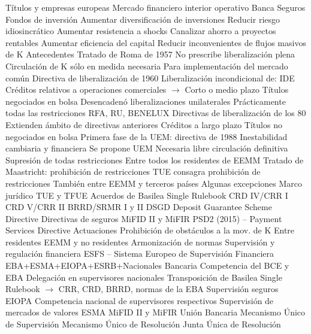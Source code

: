 \documentclass{nuevotema}
\begin{document}
\begin{esquemal}
				\4 Títulos y empresas europeas
				\4 Mercado financiero interior operativo
				\4[] Banca
				\4[] Seguros
				\4[] Fondos de inversión
			\3 Aumentar diversificación de inversiones
				\4 Reducir riesgo idiosincrático
				\4 Aumentar resistencia a shocks
			\3 Canalizar ahorro a proyectos rentables
				\4 Aumentar eficiencia del capital
				\4 Reducir inconvenientes de flujos masivos de K
		\2 Antecedentes
			\3 Tratado de Roma de 1957
				\4 No prescribe liberalización plena
				\4 Circulación de K sólo en medida necesaria
				\4[] Para implementación del mercado común
			\3 Directiva de liberalización de 1960
				\4 Liberalización incondicional de:
				\4[] IDE
				\4[] Créditos relativos a operaciones comerciales
				\4[] $\to$ Corto o medio plazo
				\4[] Títulos negociados en bolsa
				\4 Desencadenó liberalizaciones unilaterales
				\4[] Prácticamente todas las restricciones
				\4[] RFA, RU, BENELUX
			\3 Directivas de liberalización de los 80
				\4 Extienden ámbito de directivas anteriores
				\4[] Créditos a largo plazo
				\4[] Títulos no negociados en bolsa
			\3 Primera fase de la UEM: directiva de 1988
				\4 Inestabilidad cambiaria y financiera
				\4 Se propone UEM
				\4 Necesaria libre circulación definitiva
				\4 Supresión de todas restricciones
				\4[] Entre todos los residentes de EEMM
			\3 Tratado de Maastricht: prohibición de restricciones
				\4 TUE consagra prohibición de restricciones
				\4 También entre EEMM y terceros países
				\4 Algunas excepciones
		\2 Marco jurídico
			\3 TUE y TFUE
			\3 Acuerdos de Basilea
			\3 Single Rulebook
				\4 CRD IV/CRR I
				\4 CRD V/CRR II
				\4 BRRD/SRMR I y II
				\4 DSGD
				\4[] Deposit Guarantee Scheme Directive
			\3 Directivas de seguros
			\3 MiFID II y MiFIR
			\3 PSD2 (2015) -- Payment Services Directive
		\2 Actuaciones
			\3 Prohibición de obstáculos a la mov. de K
				\4 Entre residentes EEMM y no residentes
				\4 Armonización de normas
			\3 Supervisión y regulación financiera
				\4 ESFS -- Sistema Europeo de Supervisión Financiera
				\4[] EBA+ESMA+EIOPA+ESRB+Nacionales
				\4 Bancaria
				\4[] Competencia del BCE y EBA
				\4[] Delegación en supervisores nacionales
				\4[] Transposición de Basilea
				\4[] Single Rulebook
				\4[] $\to$ CRR, CRD, BRRD, normas de la EBA
				\4 Supervisión seguros
				\4[] EIOPA
				\4[] Competencia nacional de supervisores respectivos
				\4 Supervisión de mercados de valores
				\4[] ESMA
				\4[] MiFID II y MiFIR
			\3 Unión Bancaria
				\4 Mecanismo Único de Supervisión
				\4 Mecanismo Único de Resolución
				\4[] Junta Única de Resolución

\end{esquemal}
\end{document}
